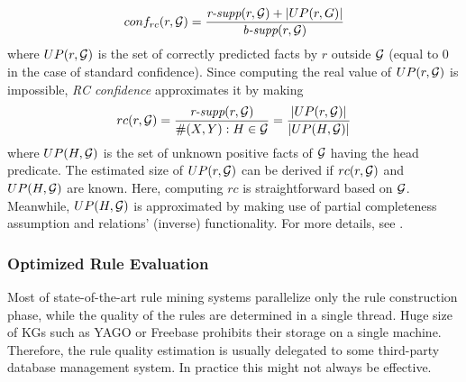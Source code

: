 \[
conf_{rc}(r,\mathcal{G}) = \frac{\textit{r-supp}(r,\mathcal{G}) + |UP(r,G)|}{\textit{b-supp}(r,\mathcal{G})}
\]
where $UP(r,\mathcal{G})$ is the set of correctly predicted facts by $r$ outside $\mathcal{G}$ (equal to 0 in the case of standard confidence).
Since computing the real value of $UP(r,\mathcal{G})$ is impossible, \textit{RC confidence} approximates it by making 
\[rc(r,\mathcal{G}) = \frac{\textit{r-supp}(r,\mathcal{G})}{\#(X,Y):H \in \mathcal{G}} = \frac{|UP(r,\mathcal{G})|}{|UP(H, \mathcal{G})|}\]
where $UP(H, \mathcal{G})$ is the set of unknown positive facts of $\mathcal{G}$ having the head predicate. The estimated size of $UP(r,\mathcal{G})$ can be derived if $rc(r,\mathcal{G})$ and $UP(H, \mathcal{G})$ are known. Here, computing $rc$ is straightforward based on $\mathcal{G}$. Meanwhile, $UP(H, \mathcal{G})$ is approximated by making use of partial completeness assumption and relations' (inverse) functionality. For more details, see \cite{DBLP:conf/www/ZupancD18}.


\subsubsection{Optimized Rule Evaluation}
Most of state-of-the-art rule mining systems parallelize only the rule construction phase, while the quality of the rules are determined in a single thread. Huge size of KGs such as YAGO or Freebase %
prohibits their storage on %
a single machine. Therefore, %
the rule quality estimation %
is usually delegated to some third-party database management system.
In practice this might not always be effective. %

